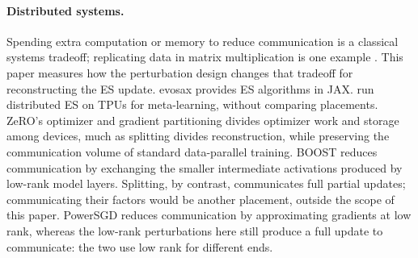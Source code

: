 \paragraph{Distributed systems.} Spending extra computation or memory to reduce communication
is a classical systems tradeoff; replicating data in matrix multiplication is one example
\citep{solomonik2011}. This paper measures how the perturbation design changes that tradeoff
for reconstructing the ES update. evosax \citep{lange2022evosax} provides ES algorithms in JAX.
\citet{sheng2020tpu} run distributed ES on TPUs for meta-learning, without comparing
placements. ZeRO's optimizer and gradient partitioning \citep{rajbhandari2020zero} divides
optimizer work and storage among devices, much as splitting divides reconstruction, while
preserving the communication volume of standard data-parallel training. BOOST
\citep{wang2026boost} reduces communication by exchanging the smaller intermediate activations
produced by low-rank model layers. Splitting, by contrast, communicates full partial updates; communicating their factors
would be another placement, outside the scope of this paper. PowerSGD \citep{vogels2019}
reduces communication by approximating gradients at low rank, whereas the low-rank
perturbations here still produce a full update to communicate: the two use low rank for
different ends.
